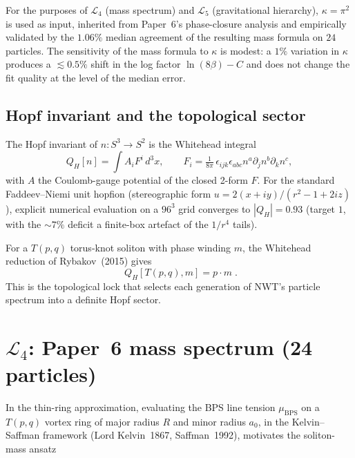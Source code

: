 \documentclass[11pt]{article}
\begin{document}
For the purposes of $\mathcal{L}_4$ (mass spectrum) and
$\mathcal{L}_5$ (gravitational hierarchy), $\kappa = \pi^2$ is used
as input, inherited from Paper~6's phase-closure analysis and
empirically validated by the $1.06\%$ median agreement of the
resulting mass formula on $24$ particles.  The sensitivity of the
mass formula to $\kappa$ is modest: a $1\%$ variation in $\kappa$
produces a $\lesssim 0.5\%$ shift in the log factor
$\ln(8\beta) - C$ and does not change the fit quality at the level
of the median error.

\subsection{Hopf invariant and the topological sector}

The Hopf invariant of $n: S^3 \to S^2$ is the Whitehead integral
\begin{equation}
  Q_H[n]  =  \int A_i F^i \, d^3 x ,
  \qquad
  F_i = \tfrac{1}{8\pi}\, \epsilon_{ijk} \epsilon_{abc}
        n^a \partial_j n^b \partial_k n^c ,
\end{equation}
with $A$ the Coulomb-gauge potential of the closed 2-form $F$.
For the standard Faddeev--Niemi unit hopfion (stereographic form
$u = 2(x + iy) / (r^2 - 1 + 2iz)$), explicit numerical evaluation
on a $96^3$ grid converges to $|Q_H| = 0.93$ (target $1$, with the
$\sim 7\%$ deficit a finite-box artefact of the $1/r^4$ tails).

\medskip

For a $T(p, q)$ torus-knot soliton with phase winding $m$, the
Whitehead reduction of Rybakov~(2015) gives
\begin{equation}
  \boxed{\; Q_H[T(p,q), m]  =  p \cdot m \;.}
\end{equation}
This is the topological lock that selects each generation of
NWT's particle spectrum into a definite Hopf sector.

\section{$\mathcal{L}_4$: Paper~6 mass spectrum (24 particles)}
\label{sec:L4}

In the thin-ring approximation, evaluating the BPS line tension
$\mu_\text{BPS}$ on a $T(p, q)$ vortex ring of major radius $R$ and
minor radius $a_0$, in the Kelvin--Saffman framework (Lord
Kelvin~1867, Saffman~1992), motivates the soliton-mass ansatz
\end{document}
